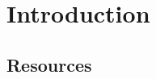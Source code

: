 \def\filepath{templates}








\def\name{Elliptic Curves}




\maketitle

%
\tableofcontents
\frontmatter

\mainmatter 
\chapter*{Introduction}

\section*{Resources}

